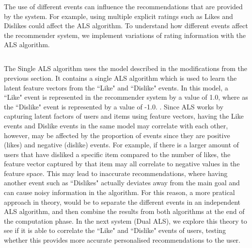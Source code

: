 The use of different events can influence the recommendations that are provided by the system. For example, using multiple explicit ratings such as Likes and Dislikes could affect the ALS algorithm. To understand how different events affect the recommender system, we implement variations of rating information with the ALS algorithm.



\subsection{}


The Single ALS algorithm uses the model described in the modifications from the previous section. It contains a single ALS algorithm which is used to learn the latent feature vectors from the ``Like" and ``Dislike" events. In this model, a ``Like" event is represented in the recommender system by a value of 1.0, where as the ``Dislike" event is represented by a value of -1.0. . Since ALS works by capturing latent factors of users and items using feature vectors, having the Like events and Dislike events in the same model may correlate with each other, however, may be affected by the proportion of events since they are positive (likes) and negative (dislike) events. For example, if there is a larger amount of users that have disliked a specific item compared to the number of likes, the feature vector captured by that item may all correlate to negative values in the feature space. This may lead to inaccurate recommendations, where having another event such as ``Dislikes" actually deviates away from the main goal and can cause noisy information in the algorithm. For this reason, a more pratical approach in theory, would be to separate the different events in an independent ALS algorithm, and then combine the results from both algorithms at the end of the computation phase. In the next system (Dual ALS), we explore this theory to see if it is able to correlate the ``Like" and ``Dislike" events of users, testing whether this provides more accurate personalised recommendations to the user. 

\subsubsection{}

